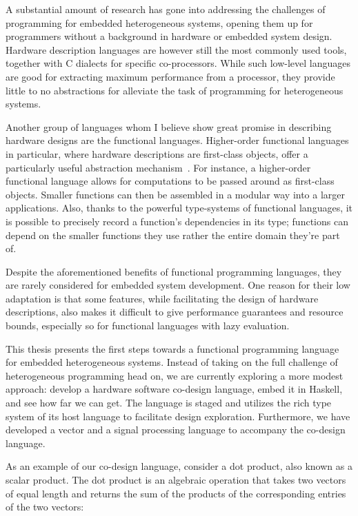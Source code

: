 \documentclass[../paper.tex]{subfiles}
\begin{document}
A substantial amount of research has gone into addressing the challenges of programming for embedded heterogeneous systems, opening them up for programmers without a background in hardware or embedded system design. Hardware description languages are however still the most commonly used tools, together with C dialects for specific co-processors. While such low-level languages are good for extracting maximum performance from a processor, they provide little to no abstractions for alleviate the task of programming for heterogeneous systems.

Another group of languages whom I believe show great promise in describing hardware designs are the functional languages. Higher-order functional languages in particular, where hardware descriptions are first-class objects, offer a particularly useful abstraction mechanism~\cite{baaij2010, bjesse1998, gill2010}. For instance, a higher-order functional language allows for computations to be passed around as first-class objects. Smaller functions can then be assembled in a modular way into a larger applications. Also, thanks to the powerful type-systems of functional languages, it is possible to precisely record a function's dependencies in its type; functions can depend on the smaller functions they use rather the entire domain they're part of.

Despite the aforementioned benefits of functional programming languages, they are rarely considered for embedded system development. One reason for their low adaptation is that some features, while facilitating the design of hardware descriptions, also makes it difficult to give performance guarantees and resource bounds, especially so for functional languages with lazy evaluation.

This thesis presents the first steps towards a functional programming language for embedded heterogeneous systems. Instead of taking on the full challenge of heterogeneous programming head on, we are currently exploring a more modest approach: develop a hardware software co-design language, embed it in Haskell, and see how far we can get. The language is staged and utilizes the rich type system of its host language to facilitate design exploration. Furthermore, we have developed a vector and a signal processing language to accompany the co-design language.

As an example of our co-design language, consider a dot product, also known as a scalar product. The dot product is an algebraic operation that takes two vectors of equal length and returns the sum of the products of the corresponding entries of the two vectors:
\end{document}
